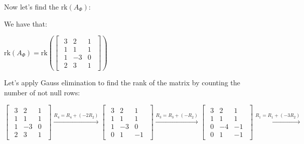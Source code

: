 \singlespacing
\singlespacing

Now let's find the $\text{rk}(A_\Phi)$:

\singlespacing

We have that:

\singlespacing

\begin{math}
    \text{rk}(A_\Phi)=\text{rk}\left(\begin{bmatrix}
            \begin{array}{ccc}
                3 & 2   & 1 \\
                1 & 1   & 1 \\
                1 & - 3 & 0 \\
                2 & 3   & 1
            \end{array}
        \end{bmatrix}\right)
\end{math}

\singlespacing

Let's apply Gauss elimination to find the rank of the matrix by counting the number of not null rows:

\singlespacing

\begin{math}
    \begin{bmatrix}
        \begin{array}{ccc}
            3 & 2  & 1 \\
            1 & 1  & 1 \\
            1 & -3 & 0 \\
            2 & 3  & 1
        \end{array}
    \end{bmatrix} \xrightarrow{R_4 = R_4 + (-2R_2)}
    \begin{bmatrix}
        \begin{array}{ccc}
            3 & 2  & 1  \\
            1 & 1  & 1  \\
            1 & -3 & 0  \\
            0 & 1  & -1
        \end{array}
    \end{bmatrix} \xrightarrow{R_3 = R_3 + (-R_2)}
    \begin{bmatrix}
        \begin{array}{ccc}
            3 & 2  & 1  \\
            1 & 1  & 1  \\
            0 & -4 & -1 \\
            0 & 1  & -1
        \end{array}
    \end{bmatrix} \xrightarrow{R_1 = R_1 + (-3R_2)}
\end{math}

